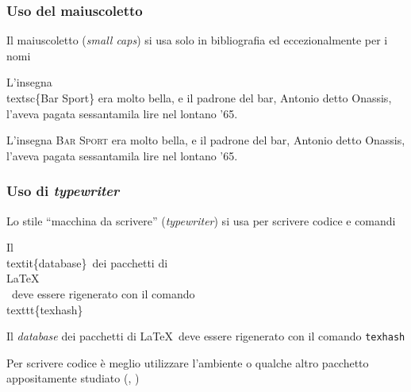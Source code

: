 \documentclass[svgnames,%
	ucs,%
	pdftex]{guitbeamer}
\begin{document}
\begin{frame}
  \frametitle{Uso del maiuscoletto}
	Il maiuscoletto (\textit{small caps}) si usa solo in bibliografia ed
	eccezionalmente per i nomi 
	\begin{LaTeXcode}
		L'insegna \alert{\\textsc\{}Bar Sport\alert{\}} era molto bella, e
		il padrone del bar, Antonio detto Onassis, l'aveva pagata
		sessantamila lire nel lontano '65.
	\end{LaTeXcode}
	\begin{LaTeXoutput}
		L'insegna \textsc{Bar Sport} era molto bella, e il padrone del
		bar, Antonio detto Onassis, l'aveva pagata sessantamila lire nel
		lontano '65.
	\end{LaTeXoutput}
\end{frame}
\begin{frame}
  \frametitle{Uso di \textit{typewriter}}
	Lo stile ``macchina da scrivere'' (\textit{typewriter}) si usa per
	scrivere codice e comandi
	\begin{LaTeXcode}
		Il \\textit\{database\}\ dei pacchetti di \\LaTeX\\ \ deve essere
		rigenerato con il comando \alert{\\texttt\{}texhash\alert{\}}
	\end{LaTeXcode}
	\begin{LaTeXoutput}
		Il \textit{database} dei pacchetti di \LaTeX\ deve essere
		rigenerato con il comando \texttt{texhash} 
	\end{LaTeXoutput}
	Per scrivere codice \`e meglio utilizzare l'ambiente  o
	qualche altro pacchetto appositamente studiato (,
	)
\end{frame}
\end{document}
